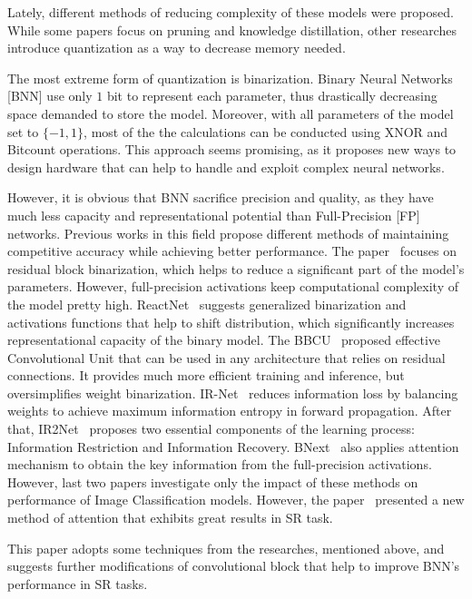 \documentclass{article}
\begin{document}
Lately, different methods of reducing complexity of these models were proposed. While some papers focus on pruning and knowledge distillation, other researches introduce quantization as a way to decrease memory needed.

The most extreme form of quantization is binarization. Binary Neural Networks [BNN] use only $1$ bit to represent each parameter, thus drastically decreasing space demanded to store the model. Moreover, with all parameters of the model set to $\{-1, 1\}$, most of the the calculations can be conducted using XNOR and Bitcount operations. This approach seems promising, as it proposes new ways to design hardware that can help to handle and exploit complex neural networks.

However, it is obvious that BNN sacrifice precision and quality, as they have much less capacity and representational potential than Full-Precision [FP] networks. Previous works in this field propose different methods of maintaining competitive accuracy while achieving better performance. The paper~\cite{ma2019efficient} focuses on residual block binarization, which helps to reduce a significant part of the model's parameters. However, full-precision activations keep computational complexity of the model pretty high. ReactNet~\cite{liu2020reactnet} suggests generalized binarization and activations functions that help to shift distribution, which significantly increases representational capacity of the binary model. The BBCU~\cite{xia2022basic} proposed effective Convolutional Unit that can be used in any architecture that relies on residual connections. It provides much more efficient training and inference, but oversimplifies weight binarization. IR-Net~\cite{qin2020forward} reduces information loss by balancing weights to achieve maximum information entropy in forward propagation. After that, IR2Net~\cite{xue2022ir2net} proposes two essential components of the learning process: Information Restriction and Information Recovery. BNext~\cite{guo2022join} also applies attention mechanism to obtain the key information from the full-precision activations. 
However, last two papers investigate only the impact of these methods on performance of Image Classification models. However, the paper~\cite{zhao2020efficient} presented a new method of attention that exhibits great results in SR task.

This paper adopts some techniques from the researches, mentioned above, and suggests further modifications of convolutional block that help to improve BNN's performance in SR tasks.
\end{document}
